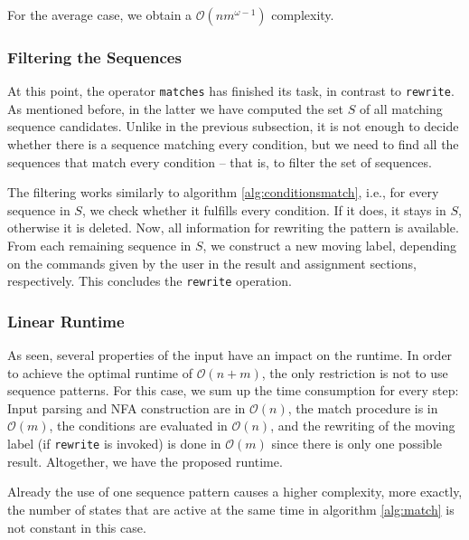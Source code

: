 \documentclass{sig-alternate}
\begin{document}
For the average case, we obtain a $\mathcal O(nm^{\omega-1})$ complexity.

\subsubsection{Filtering the Sequences}
At this point, the operator \texttt{matches} has finished its task, in contrast to \texttt{rewrite}. As mentioned before, in the latter we have computed the set $S$ of all matching sequence candidates. Unlike in the previous subsection, it is not enough to decide whether there is a sequence matching every condition, but we need to find all the sequences that match every condition -- that is, to filter the set of sequences.

The filtering works similarly to algorithm \ref{alg:conditionsmatch}, i.e., for every sequence in $S$, we check whether it fulfills every condition. If it does, it stays in $S$, otherwise it is deleted. Now, all information for rewriting the pattern is available. From each remaining sequence in $S$, we construct a new moving label, depending on the commands given by the user in the result and assignment sections, respectively. This concludes the \texttt{rewrite} operation.

\subsubsection{Linear Runtime}
As seen, several properties of the input have an impact on the runtime. In order to achieve the optimal runtime of $\mathcal O(n+m)$, the only restriction is not to use sequence patterns. For this case, we sum up the time consumption for every step: Input parsing and NFA construction are in $\mathcal O(n)$, the match procedure is in $\mathcal O(m)$, the conditions are evaluated in $\mathcal O(n)$, and the rewriting of the moving label (if \texttt{rewrite} is invoked) is done in $\mathcal O(m)$ since there is only one possible result. Altogether, we have the proposed runtime.

Already the use of one sequence pattern causes a higher complexity, more exactly, the number of states that are active at the same time in algorithm \ref{alg:match} is not constant in this case.
\end{document}
